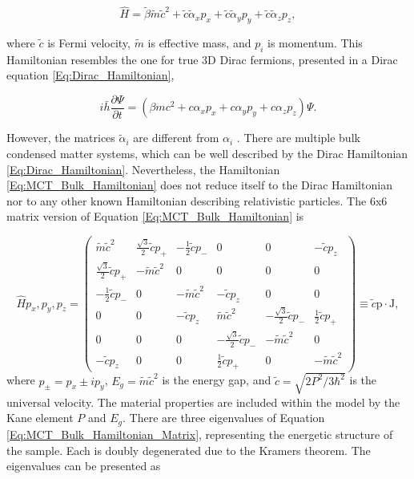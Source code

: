 \documentclass[titlepage,a4paper]{book}
\begin{document}
\begin{equation}
\label{Eq:MCT_Bulk_Hamiltonian}
\hat{H} = \tilde{\beta} \tilde{m}\tilde{c}^2 + \tilde{c}\tilde{\alpha}_x p_x + \tilde{c}\tilde{\alpha}_y p_y + \tilde{c}\tilde{\alpha}_z p_z ,
\end{equation}

where $\tilde{c}$ is Fermi velocity, $\tilde{m}$ is effective mass, and $p_i$ is momentum. This Hamiltonian resembles the one for true 3D Dirac fermions, presented in a Dirac equation \ref{Eq:Dirac_Hamiltonian}, 

\begin{equation}
\label{Eq:Dirac_Hamiltonian}
i\bar{h} \frac{\partial \Psi}{\partial t} = \left( \beta mc^2 + c\alpha_x p_x + c\alpha_y p_y + c\alpha_z p_z \right) \Psi.
\end{equation}

However, the matrices $\tilde{\alpha}_i$ are different from $\alpha_i$ \cite{Teppe_MCT}. There are multiple bulk condensed matter systems, which can be well described by the Dirac Hamiltonian \ref{Eq:Dirac_Hamiltonian}. Nevertheless, the Hamiltonian \ref{Eq:MCT_Bulk_Hamiltonian} does not reduce itself to the Dirac Hamiltonian nor to any other known Hamiltonian describing relativistic particles. The 6x6 matrix version of Equation \ref{Eq:MCT_Bulk_Hamiltonian} is

\begin{equation}
\label{Eq:MCT_Bulk_Hamiltonian_Matrix}
\hat{H}{p_x, p_y, p_z} = \left( \begin{array}{cccccc}
\tilde{m}\tilde{c}^2 & \frac{\sqrt{3}}{2}\tilde{c}{p_+} & -\frac{1}{2}\tilde{c}{p_{-}} & 0 & 0 & -\tilde{c}p_z \\
\frac{\sqrt{3}}{2}\tilde{c}{p_+} & -\tilde{m}\tilde{c}^2 & 0 & 0 & 0 & 0 \\
-\frac{1}{2}\tilde{c}{p_-} & 0 & -\tilde{m}\tilde{c}^2 & -\tilde{c}p_z & 0 & 0 \\
0 & 0 & -\tilde{c}p_z & \tilde{m}\tilde{c}^2 & -\frac{\sqrt{3}}{2}\tilde{c}{p_-} & \frac{1}{2}\tilde{c}{p_+} \\
0 & 0 & 0 & -\frac{\sqrt{3}}{2}\tilde{c}{p_-} & -\tilde{m}\tilde{c}^2 &0 \\
-\tilde{c}p_z & 0 & 0 & \frac{1}{2}\tilde{c}{p_+} & 0 & -\tilde{m}\tilde{c}^2 \end{array} \right) \equiv \tilde{c}\boldsymbol{\mathrm{p}} \cdot \boldsymbol{\mathrm{J}},
\end{equation}
where $p_{\pm} = p_x \pm ip_y$, $E_g = \tilde{m}\tilde{c}^2$ is the energy gap, and $\tilde{c} = \sqrt{2P^2 / 3 \hbar^2}$ is the universal velocity. The material properties are included within the model by the Kane element $P$ and $E_g$. There are three eigenvalues of Equation \ref{Eq:MCT_Bulk_Hamiltonian_Matrix}, representing the energetic structure of the sample. Each is doubly degenerated due to the Kramers theorem. The eigenvalues can be presented as
\end{document}
